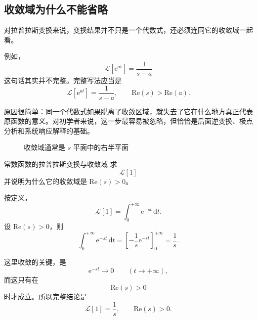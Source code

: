 \subsection{收敛域为什么不能省略}

对拉普拉斯变换来说，变换结果并不只是一个代数式，还必须连同它的收敛域一起看。

例如，
\[
    \mathcal{L}[\mathrm{e}^{at}]
    =
    \frac{1}{s-a}
\]
这句话其实并不完整。完整写法应当是
\[
    \mathcal{L}[\mathrm{e}^{at}]
    =
    \frac{1}{s-a},
    \qquad
    \mathrm{Re}(s)>\mathrm{Re}(a).
\]

原因很简单：同一个代数式如果脱离了收敛区域，就失去了它在什么地方真正代表原函数的意义。对初学者来说，这一步最容易被忽略，但恰恰是后面逆变换、极点分析和系统响应解释的基础。

\begin{figure}[htbp]
\centering
{}
\caption{收敛域通常是 $s$ 平面中的右半平面}
\label{fig:laplace-roc}
\end{figure}

\begin{lizi}{常数函数的拉普拉斯变换与收敛域}{}
求
\[
    \mathcal{L}[1]
\]
并说明为什么它的收敛域是 $\mathrm{Re}(s)>0$。

\begin{jie}
按定义，
\[
    \mathcal{L}[1]
    =
    \int_0^{+\infty} \mathrm{e}^{-st}\,\mathrm{d}t.
\]
设 $\mathrm{Re}(s)>0$，则
\[
    \int_0^{+\infty} \mathrm{e}^{-st}\,\mathrm{d}t
    =
    \left[
        -\frac{1}{s}\mathrm{e}^{-st}
    \right]_{0}^{+\infty}
    =
    \frac{1}{s}.
\]

这里收敛的关键，是
\[
    \mathrm{e}^{-st}\to 0
    \qquad (t\to+\infty),
\]
而这只有在
\[
    \mathrm{Re}(s)>0
\]
时才成立。所以完整结论是
\[
    \mathcal{L}[1]
    =
    \frac{1}{s},
    \qquad
    \mathrm{Re}(s)>0.
\]
\end{jie}
\end{lizi}

